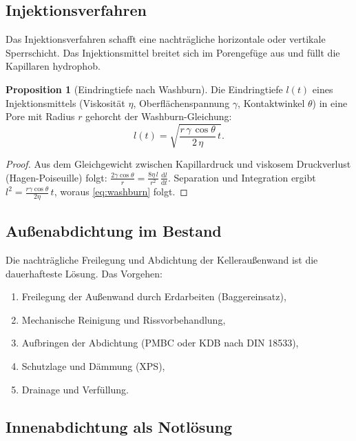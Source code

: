 ﻿\documentclass[a4paper,12pt]{article}
\theoremstyle{definition}
\newtheorem{proposition}[theorem]{Proposition}
\begin{document}
\subsection{Injektionsverfahren}

Das Injektionsverfahren schafft eine nachtr\"agliche horizontale oder
vertikale Sperrschicht. Das Injektionsmittel breitet sich im Porengef\"uge
aus und f\"ullt die Kapillaren hydrophob.

\begin{proposition}[Eindringtiefe nach Washburn]
\label{prop:washburn}
Die Eindringtiefe $l(t)$ eines Injektionsmittels (Viskosit\"at $\eta$,
Oberfl\"achenspannung $\gamma$, Kontaktwinkel $\theta$) in eine Pore mit
Radius $r$ gehorcht der Washburn-Gleichung:
\begin{equation}
  l(t) = \sqrt{\frac{r\,\gamma\,\cos\theta}{2\,\eta}\,t}.
  \label{eq:washburn}
\end{equation}
\end{proposition}

\begin{proof}
Aus dem Gleichgewicht zwischen Kapillardruck und viskosem Druckverlust
(Hagen-Poiseuille) folgt:
$\frac{2\gamma\cos\theta}{r} = \frac{8\eta\,l}{r^2}\,\frac{\mathrm{d}l}{\mathrm{d}t}$.
Separation und Integration ergibt $l^2 = \frac{r\gamma\cos\theta}{2\eta}\,t$,
woraus \cref{eq:washburn} folgt. 
\end{proof}

\subsection{Au\ss{}enabdichtung im Bestand}

Die nachtr\"agliche Freilegung und Abdichtung der Kellerau\ss{}enwand ist
die dauerhafteste L\"osung. Das Vorgehen:
\begin{enumerate}
  \item Freilegung der Au\ss{}enwand durch Erdarbeiten (Baggereinsatz),
  \item Mechanische Reinigung und Rissvorbehandlung,
  \item Aufbringen der Abdichtung (PMBC oder KDB nach DIN 18533),
  \item Schutzlage und D\"ammung (XPS),
  \item Drainage und Verf\"ullung.
\end{enumerate}

\subsection{Innenabdichtung als Notl\"osung}
\end{document}
